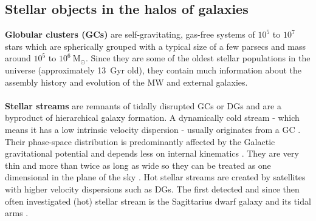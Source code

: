 \subsection{Stellar objects in the halos of galaxies}\label{subsec:halo_objects}
\textbf{Globular clusters (\acp{GC})} are self-gravitating, gas-free systems of $10^5$ to $10^7$ stars which are spherically grouped with a typical size of a few parsecs and mass around $10^5$ to $10^6\ \mathrm{M}_\odot$. Since they are some of the oldest stellar populations in the universe (approximately \SI{13}{Gyr} old), they contain much information about the assembly history and evolution of the \ac{MW} and external galaxies. \\\\
\textbf{Stellar streams} are remnants of tidally disrupted \acp{GC} or \acp{DG} and are a byproduct of hierarchical galaxy formation. A dynamically cold stream - which means it has a low intrinsic velocity dispersion - usually originates from a \ac{GC} \citep{Bonaca...streamsinfo...2018}. Their phase-space distribution is predominantly affected by the Galactic gravitational potential and depends less on internal kinematics \citep{Kupper...streams...2010, Kupper...streams...2012}. They are very thin and more than twice as long as wide so they can be treated as one dimensional in the plane of the sky \citep{Bonaca...streamsinfo...2018}. Hot stellar streams are created by satellites with higher velocity dispersions such as \acp{DG}. The first detected and since then often investigated (hot) stellar stream is the Sagittarius dwarf galaxy and its tidal arms \citep{Ibata...Sagittarius....1994}.

